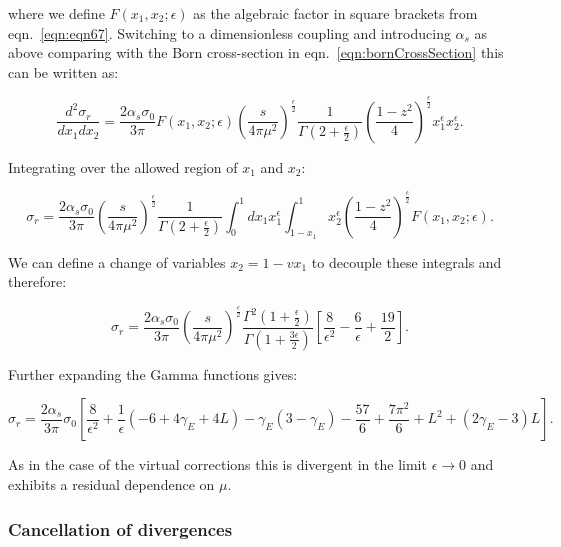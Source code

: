 			where we define $F(x_1, x_2; \epsilon)$ as the algebraic factor in square brackets from eqn.~\eqref{eqn:eqn67}.  Switching to
			a dimensionless coupling and introducing $\alpha_s$ as above comparing with the Born cross-section in
			eqn.~\eqref{eqn:bornCrossSection} this can be written as:

			\begin{equation}
				\frac{d^2\sigma_r}{dx_1dx_2} = \frac{2\alpha_s\sigma_0}{3\pi}F(x_1, x_2; \epsilon)\left(\frac{s}{4\pi\mu^2}\right)^
				{\frac{\epsilon}{2}}\frac{1}{\Gamma(2+\frac{\epsilon}{2})}\left(\frac{1-z^2}{4}\right)^{\frac{\epsilon}{2}}x_1^\epsilon x_2^\epsilon.
			\end{equation}

			Integrating over the allowed region of $x_1$ and $x_2$:

			\begin{equation}
				\sigma_r = \frac{2\alpha_s\sigma_0}{3\pi}\left(\frac{s}{4\pi\mu^2}\right)^{\frac{\epsilon}{2}}\frac{1}{\Gamma(2+\frac{\epsilon}{2})}
				\int_0^1dx_1x_1^\epsilon\int^1_{1-x_1}x_2^\epsilon\left(\frac{1-z^2}{4}\right)^{\frac{\epsilon}{2}}F(x_1, x_2;\epsilon).
				\label{eqn:eqn72}
			\end{equation}

			We can define a change of variables $x_2=1-vx_1$ to decouple these integrals and therefore:

			\begin{equation}
				\sigma_r = \frac{2\alpha_s\sigma_0}{3\pi}\left(\frac{s}{4\pi\mu^2}\right)^{\frac{\epsilon}{2}}\frac{\Gamma^2
				\left(1+\frac{\epsilon}{2}\right)}{\Gamma\left(1+\frac{3\epsilon}{2}\right)}\left[\frac{8}{\epsilon^2} - \frac{6}{\epsilon} + \frac{19}{2}\right].
			\end{equation}

			Further expanding the Gamma functions gives:

			\begin{equation*}
				\sigma_r = \frac{2\alpha_s}{3\pi}\sigma_0\left[\frac{8}{\epsilon^2} + \frac{1}{\epsilon}\left(-6+4\gamma_E+4L\right)-
				\gamma_E(3-\gamma_E)-\frac{57}{6}+\frac{7\pi^2}{6}+L^2+(2\gamma_E-3)L\right].
			\end{equation*}

			As in the case of the virtual corrections this is divergent in the limit $\epsilon\rightarrow0$ and exhibits a residual
			dependence on $\mu$.

		\subsubsection{Cancellation of divergences}

